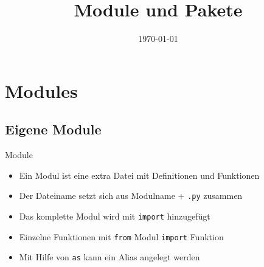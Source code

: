 

\usepackage{comment}

\newcommand{\topic}{
	Module und Pakete
}

\title{\topic}
\supertitle{\course}
\date{\today}



\maketitle

\begin{frame}
	\tableofcontents
\end{frame}


\section{Modules}
\subsection{Eigene Module}
\begin{frame}[fragile]{Module}
	\begin{itemize}
		\item Ein Modul ist eine extra Datei mit Definitionen und Funktionen
		\item Der Dateiname setzt sich aus Modulname + \texttt{.py} zusammen
		\item Das komplette Modul wird mit \texttt{import} hinzugefügt
		\item Einzelne Funktionen mit \texttt{from} Modul \texttt{import} Funktion
		\item Mit Hilfe von \texttt{as} kann ein Alias angelegt werden
	\end{itemize}

\end{frame}

